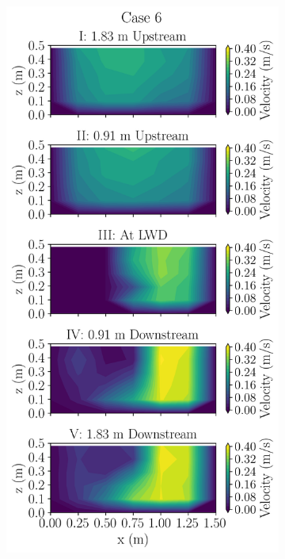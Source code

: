 \documentclass[preview, border=2pt]{standalone}
\begin{document}
\begin{figure}
\begin{subfigure}[b]{0.24\textwidth}
     \end{subfigure}
     \hfill     
     \begin{subfigure}[b]{0.24\textwidth}
         \centering
         \caption{}
         \includegraphics[width=\textwidth]{Case6_velocity_contours.png}

\end{subfigure}
\end{figure}
\end{document}
